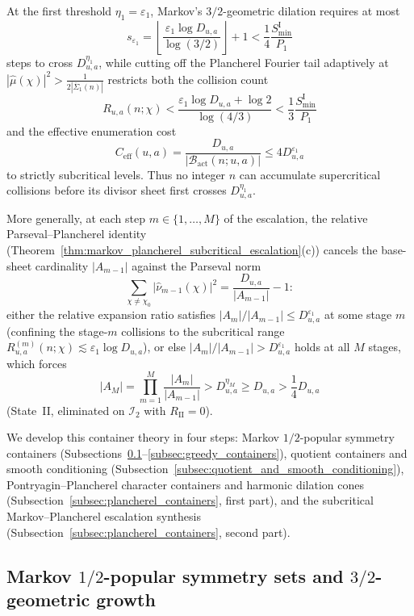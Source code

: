 \documentclass[11pt, a4paper]{article}
\theoremstyle{plain}
\theoremstyle{definition}
\begin{document}
\begin{enumerate}[label=\arabic*.]
    At the first threshold $\eta_1=\varepsilon_1$, Markov's $3/2$-geometric dilation requires at most 
    \[
    s_{\varepsilon_1}=\left\lfloor\frac{\varepsilon_1\log D_{u,a}}{\log(3/2)}\right\rfloor+1<\frac14\frac{S_{\min}^{\mathrm{I}}}{P_1}
    \]
    steps to cross $D_{u,a}^{\eta_1}$, while cutting off the Plancherel Fourier tail adaptively at $|\widehat{\mu}(\chi)|^{2}>\frac{1}{2|\overline{\Sigma}_1(n)|}$ restricts both the collision count 
    \[
    R_{u,a}(n;\chi)<\frac{\varepsilon_1\log D_{u,a}+\log 2}{\log(4/3)}<\frac13\frac{S_{\min}^{\mathrm{I}}}{P_1}
    \]
    and the effective enumeration cost 
    \[
    C_{\mathrm{eff}}(u,a)=\frac{D_{u,a}}{|\mathcal{B}_{\mathrm{act}}(n;u,a)|}\le 4D_{u,a}^{\varepsilon_1}
    \]
    to strictly subcritical levels. Thus no integer $n$ can accumulate supercritical collisions before its divisor sheet first crosses $D_{u,a}^{\eta_1}$. 
    
    More generally, at each step $m\in\{1,\dots,M\}$ of the escalation, the relative Parseval--Plancherel identity (Theorem~\ref{thm:markov_plancherel_subcritical_escalation}(c)) cancels the base-sheet cardinality $|A_{m-1}|$ against the Parseval norm 
    \[
    \sum_{\chi\neq\chi_0}|\widehat{\nu}_{m-1}(\chi)|^{2}=\frac{D_{u,a}}{|A_{m-1}|}-1:
    \]
    either the relative expansion ratio satisfies $|A_m|/|A_{m-1}|\le D_{u,a}^{\varepsilon_1}$ at some stage $m$ (confining the stage-$m$ collisions to the subcritical range $R_{u,a}^{(m)}(n;\chi)\lesssim\varepsilon_1\log D_{u,a}$), or else $|A_m|/|A_{m-1}|>D_{u,a}^{\varepsilon_1}$ holds at all $M$ stages, which forces 
    \[
    |A_M|=\prod_{m=1}^{M}\frac{|A_m|}{|A_{m-1}|}>D_{u,a}^{\eta_M}\ge D_{u,a}>\frac14 D_{u,a}
    \]
    (State~II, eliminated on $\mathcal{I}_2$ with $R_{\mathrm{II}}=0$).
\end{enumerate}

We develop this container theory in four steps: Markov $1/2$-popular symmetry containers (Subsections~\ref{subsec:markov_popular}--\ref{subsec:greedy_containers}), quotient containers and smooth conditioning (Subsection~\ref{subsec:quotient_and_smooth_conditioning}), Pontryagin--Plancherel character containers and harmonic dilation cones (Subsection~\ref{subsec:plancherel_containers}, first part), and the subcritical Markov--Plancherel escalation synthesis (Subsection~\ref{subsec:plancherel_containers}, second part).

\subsection{Markov $1/2$-popular symmetry sets and $3/2$-geometric growth}\label{subsec:markov_popular}
\end{document}
